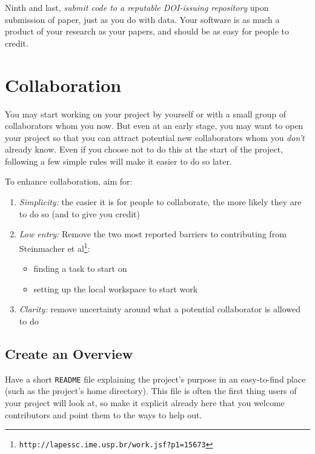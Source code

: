 \documentclass[10pt]{article}
\newcommand{\withurl}[2]{{#1}\footnote{\texttt{#2}}}
\begin{document}
Ninth and last, \emph{submit code to a reputable DOI-issuing repository}
upon submission of paper, just as you do with data. Your software is as
much a product of your research as your papers, and should be as easy
for people to credit.

\section{Collaboration}\label{collaboration}

You may start working on your project by yourself or with a small group
of collaborators whom you now. But even at an early stage, you may want
to open your project so that you can attract potential new collaborators
whom you \emph{don't} already know. Even if you choose not to do this at
the start of the project, following a few simple rules will make it
easier to do so later.

To enhance collaboration, aim for:

\begin{enumerate}
\item
  \emph{Simplicity:} the easier it is for people to collaborate, the
  more likely they are to do so (and to give you credit)
\item
  \emph{Low entry:} Remove the two most reported barriers to
  contributing from \withurl{Steinmacher et
    al}{http://lapessc.ime.usp.br/work.jsf?p1=15673}:

  \begin{itemize}
  \item
    finding a task to start on
  \item
    setting up the local workspace to start work
  \end{itemize}
\item
  \emph{Clarity:} remove uncertainty around what a potential
  collaborator is allowed to do
\end{enumerate}

\subsection*{Create an Overview}

Have a short \texttt{README} file explaining the project's purpose in an
easy-to-find place (such as the project's home directory). This file is
often the first thing users of your project will look at, so make it
explicit already here that you welcome contributors and point them to
the ways to help out.
\end{document}
